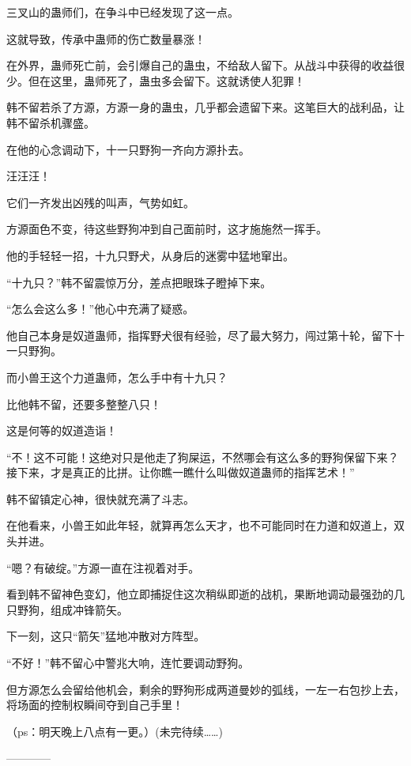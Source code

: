 \begin{this_body}
三叉山的蛊师们，在争斗中已经发现了这一点。

这就导致，传承中蛊师的伤亡数量暴涨！

在外界，蛊师死亡前，会引爆自己的蛊虫，不给敌人留下。从战斗中获得的收益很少。但在这里，蛊师死了，蛊虫多会留下。这就诱使人犯罪！

韩不留若杀了方源，方源一身的蛊虫，几乎都会遗留下来。这笔巨大的战利品，让韩不留杀机骤盛。

在他的心念调动下，十一只野狗一齐向方源扑去。

汪汪汪！

它们一齐发出凶残的叫声，气势如虹。

方源面色不变，待这些野狗冲到自己面前时，这才施施然一挥手。

他的手轻轻一招，十九只野犬，从身后的迷雾中猛地窜出。

“十九只？”韩不留震惊万分，差点把眼珠子瞪掉下来。

“怎么会这么多！”他心中充满了疑惑。

他自己本身是奴道蛊师，指挥野犬很有经验，尽了最大努力，闯过第十轮，留下十一只野狗。

而小兽王这个力道蛊师，怎么手中有十九只？

比他韩不留，还要多整整八只！

这是何等的奴道造诣！

“不！这不可能！这绝对只是他走了狗屎运，不然哪会有这么多的野狗保留下来？接下来，才是真正的比拼。让你瞧一瞧什么叫做奴道蛊师的指挥艺术！”

韩不留镇定心神，很快就充满了斗志。

在他看来，小兽王如此年轻，就算再怎么天才，也不可能同时在力道和奴道上，双头并进。

“嗯？有破绽。”方源一直在注视着对手。

看到韩不留神色变幻，他立即捕捉住这次稍纵即逝的战机，果断地调动最强劲的几只野狗，组成冲锋箭矢。

下一刻，这只“箭矢”猛地冲散对方阵型。

“不好！”韩不留心中警兆大响，连忙要调动野狗。

但方源怎么会留给他机会，剩余的野狗形成两道曼妙的弧线，一左一右包抄上去，将场面的控制权瞬间夺到自己手里！

（ps：明天晚上八点有一更。）(未完待续……)

------------

\end{this_body}

